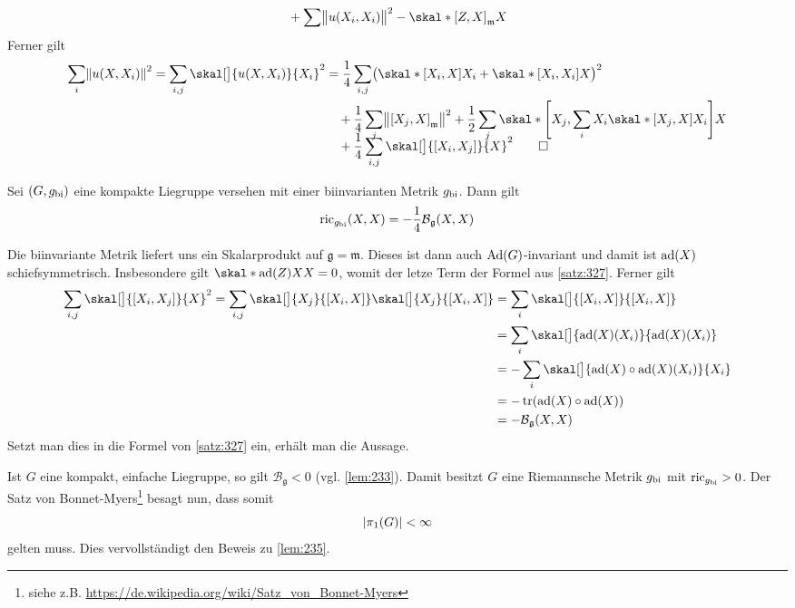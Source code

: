 \begin{beweis}
\begin{align}
		&\hspace{1em}+ \sum \norm[\big]{u(X_i,X_i)}^2 - \skal*{\benbrace*{Z,X}_\mathfrak{m}}{X}
	\end{align}
	Ferner gilt
	\begin{align}
		\sum_i \norm*{u(X,X_i)}^2 = \sum_{i,j} \skal[\big]{u(X,X_i)}{X_i}^2 &= \frac{1}{4} \sum_{i,j} \enbrace[\big]{\skal*{\benbrace*{X_i,X}}{X_i} + \skal*{\benbrace*{X_i,X_i}}{X}}^2 \\
		& \quad + \frac{1}{4} \sum_j \norm*{\benbrace*{X_j,X}_\mathfrak{m}}^2  + \frac{1}{2} \sum_j \skal*{\benbrace*{X_j, \sum_i X_i \skal*{\benbrace*{X_j,X}}{X_i}}}{X} \\[-1em]
		& \quad + \frac{1}{4}  \sum_{i,j} \skal[\big]{\benbrace*{X_i,X_j}}{X}^2 \qedhere 
	\end{align}
\end{beweis}

\begin{korollar}[{name=[Ricci-Krümmung einer kompakten Liegruppe]},label=korr:328]
	Sei $(G,g_{\bi})$ eine kompakte Liegruppe versehen mit einer biinvarianten Metrik $g_\bi$.
	Dann gilt
	\[
		\ric_{g_\bi}(X,X) = - \frac{1}{4} \mathcal{B}_{\mathfrak{g}}(X,X)
	\]
\end{korollar}
\begin{beweis}
	Die biinvariante Metrik liefert uns ein Skalarprodukt auf $\mathfrak{g} = \mathfrak{m}$. 
	Dieses ist dann auch $\Ad(G)$-invariant und damit ist $\ad(X)$ schiefsymmetrisch.
	Insbesondere gilt $\skal*{\ad(Z)X}{X} =0$, womit der letze Term der Formel aus \autoref{satz:327}.
	Ferner gilt
	\begin{align}
		\sum_{i,j} \skal[\big]{\benbrace*{X_i,X_j}}{X}^2 = \sum_{i,j} \skal[\big]{X_j}{\benbrace*{X_i,X}} \skal[\big]{X_j}{\benbrace*{X_i,X}}
		&= \sum_i \skal[\big]{\benbrace*{X_i,X}}{\benbrace*{X_i,X}} \\
		&= \sum_i \skal[\big]{\ad(X)(X_i)}{\ad(X)(X_i)} \\
		&= - \sum_i \skal[\big]{\ad(X) \circ \ad(X)(X_i)}{X_i} \\
		&= - \tr \enbrace*{\ad(X) \circ \ad(X)} \\
		&= - \mathcal{B}_{\mathfrak{g}}(X,X)
	\end{align}
	Setzt man dies in die Formel von \autoref{satz:327} ein, erhält man die Aussage.
\end{beweis}

Ist $G$ eine kompakt, einfache Liegruppe, so gilt $\mathcal{B}_{\mathfrak{g}} < 0$ (vgl. \autoref{lem:233}).
Damit besitzt $G$ eine Riemannsche Metrik $g_\bi$ mit $\ric_{g_{\bi}} >0$.
Der Satz von Bonnet-Myers\footnote{siehe z.B. \url{https://de.wikipedia.org/wiki/Satz_von_Bonnet-Myers}} besagt nun, dass somit 
\[
	\abs*{\pi_1(G)}  < \infty
\]
gelten muss.
Dies vervollständigt den Beweis zu \autoref{lem:235}.

